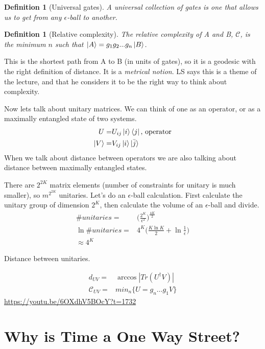 \documentclass[]{article}
\newtheorem{defn}[thm]{Definition}
\begin{document}
\begin{defn}[Universal gates]
	A universal collection of gates is one that allows us to get from any $\epsilon$-ball to another.
\end{defn}

\begin{defn}[Relative complexity]
	The relative complexity of A and B, $\mathscr{C}$, is the minimum $n$ such that $\ket{A} =g_1 g_2 ... g_n \ket{B}$.
\end{defn}

This is the shortest path from A to B (in units of gates), so it is a geodesic with the right definition of distance. It is a \emph{metrical notion}. LS says this is a theme of the lecture, and that he considers it to be the right way to think about complexity.
 


Now lets talk about unitary matrices. We can think of one as an operator, or as a maximally entangled state of two systems.
\begin{align*}
	U =& U_{ij}\ket{i}\bra{j} \text{, operator}\\
	\ket{V} =& V_{ij}\ket{i} \ket{\bar{j}}
\end{align*}
When we talk about distance between operators we are also talking about distance between maximally entangled states.

There are $2^{2K}$ matrix elements (number of constraints for unitary is much smaller), so $m^{2^{2K}}$ unitaries. Let's do an $\epsilon$-ball calculation. First calculate the unitary group of dimension $2^K$, then calculate the volume of an $\epsilon$-ball and divide.
\begin{align*}
	\#unitaries =& \bigg(\frac{2^K}{\epsilon^2}\bigg)^\frac{4K}{2}\\
	\ln \#unitaries =& 4^K\bigg(\frac{K \ln K}{2} + \ln\frac{1}{\epsilon}\bigg)\\
	\approx 4^K
\end{align*}

Distance between unitaries.

\begin{align*}
	d_{UV}=& \arccos \left|Tr(U^\dagger V)\right|\\
	\mathcal{C}_{UV}=& min_n \{U=g_n...g_1V\}
\end{align*}
\url{https://youtu.be/6OXdhV5BOcY?t=1732}

\section{Why is Time a One Way Street?}
\end{document}
